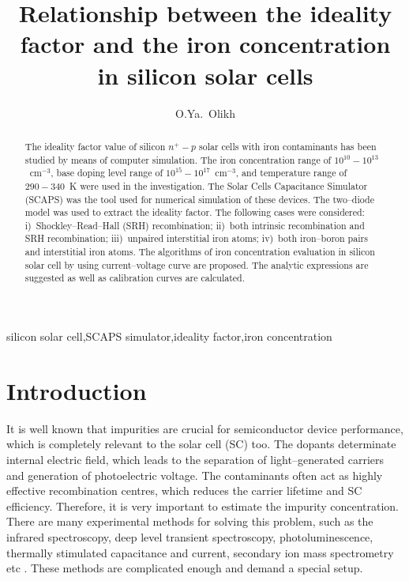 \documentclass [sort&compress] {elsarticle}
\begin{document}
\begin{frontmatter}

\title{Relationship between the ideality factor and the iron concentration in silicon solar cells}

\author{O.Ya.~Olikh}

\address{Faculty of Physics, Taras Shevchenko National University of Kyiv, Kyiv 01601, Ukraine}


\begin{abstract}
The ideality factor value of silicon $n^+-p$ solar cells with iron contaminants has been studied by means of computer simulation.
The iron concentration range of $10^{10}-10^{13}$~cm$^{-3}$, base doping level range of $10^{15}-10^{17}$~cm$^{-3}$, and temperature range of $290-340$~K were used in the investigation.
The Solar Cells Capacitance Simulator (SCAPS) was the tool used for numerical simulation of these devices.
The two--diode model was used to extract the ideality factor.
The following cases were considered: i)~Shockley--Read--Hall (SRH) recombination; ii)~both  intrinsic recombination  and SRH recombination; iii)~unpaired interstitial iron atoms; iv)~both iron--boron pairs   and  interstitial iron atoms.
The algorithms of iron concentration evaluation in silicon solar cell by using current--voltage curve are proposed.
The analytic expressions are suggested as well as calibration curves are calculated.
\end{abstract}


\begin{keyword}
silicon solar cell\sep SCAPS simulator\sep ideality factor\sep iron concentration
\end{keyword}


\end{frontmatter}


\section{Introduction}

It is well known that impurities are crucial for semiconductor device performance, which is completely relevant to the solar cell (SC) too.
The dopants determinate internal electric field, which leads to the separation of light--generated carriers and generation of photoelectric voltage.
The contaminants often act as highly effective recombination centres, which reduces the carrier lifetime and SC efficiency.
Therefore, it is very important to estimate the impurity concentration.
There are many experimental methods for solving this problem, such as the infrared spectroscopy, deep level transient spectroscopy, photoluminescence,
thermally stimulated capacitance and current, secondary ion mass spectrometry etc
\cite{Schroder2006}.
These methods are complicated enough and demand a special setup.
\end{document}
